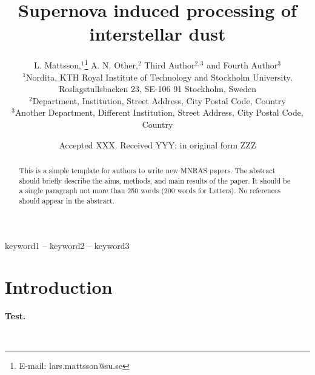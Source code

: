 \documentclass[fleqn,usenatbib]{mnras}
\title[Supernova induced processing of interstellar dust]{Supernova induced processing of interstellar dust}
\author[L. Mattsson et al.]{
L. Mattsson,$^{1}$\thanks{E-mail: lars.mattsson@su.se}
A. N. Other,$^{2}$
Third Author$^{2,3}$
and Fourth Author$^{3}$
\\
$^{1}$Nordita, KTH Royal Institute of Technology and Stockholm University, Roslagstullsbacken 23, SE-106 91 Stockholm, Sweden\\
$^{2}$Department, Institution, Street Address, City Postal Code, Country\\
$^{3}$Another Department, Different Institution, Street Address, City Postal Code, Country
}
\date{Accepted XXX. Received YYY; in original form ZZZ}
\newcommand{\fk}[1]{{\bf \textcolor{PineGreen}{#1}}}		%
\begin{document}
\label{firstpage}
\pagerange{\pageref{firstpage}--\pageref{lastpage}}
\maketitle

\begin{abstract}
This is a simple template for authors to write new MNRAS papers.
The abstract should briefly describe the aims, methods, and main results of the paper.
It should be a single paragraph not more than 250 words (200 words for Letters).
No references should appear in the abstract.
\end{abstract}

\begin{keywords}
keyword1 -- keyword2 -- keyword3
\end{keywords}



\section{Introduction}
\fk{Test.}

\newpage~
\newpage
 
\end{document}
